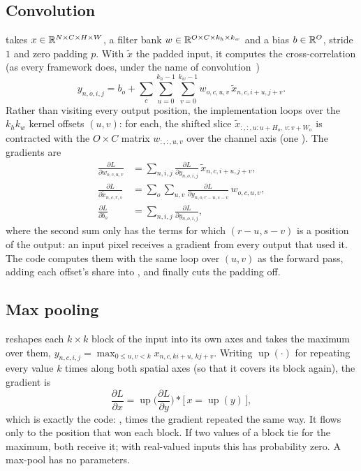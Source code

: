 \subsection{Convolution}
 takes $x \in \mathbb{R}^{N\times C\times H\times W}$, a filter bank
$w \in \mathbb{R}^{O\times C\times k_h\times k_w}$ and a bias $b \in \mathbb{R}^{O}$, stride $1$ and zero padding
$p$. With $\tilde x$ the padded input, it computes the cross-correlation (as every framework does,
under the name of convolution~\cite{upc-ipa})
\begin{equation}
  y_{n,o,i,j} = b_o + \sum_{c}\sum_{u=0}^{k_h-1}\sum_{v=0}^{k_w-1} w_{o,c,u,v}\,\tilde x_{n,c,i+u,j+v}.
\end{equation}
Rather than visiting every output position, the implementation loops over the $k_h k_w$ kernel
offsets $(u, v)$: for each, the shifted slice $\tilde x_{:,:,u:u+H_o,\,v:v+W_o}$ is contracted with
the $O\times C$ matrix $w_{:,:,u,v}$ over the channel axis (one ). The gradients are
\begin{align}
  \frac{\partial L}{\partial w_{o,c,u,v}} &= \sum_{n,i,j} \frac{\partial L}{\partial y_{n,o,i,j}}\,\tilde x_{n,c,i+u,j+v}, \\
  \frac{\partial L}{\partial \tilde x_{n,c,r,s}} &= \sum_{o}\sum_{u,v} \frac{\partial L}{\partial y_{n,o,r-u,s-v}}\, w_{o,c,u,v}, \\
  \frac{\partial L}{\partial b_o} &= \sum_{n,i,j} \frac{\partial L}{\partial y_{n,o,i,j}},
\end{align}
where the second sum only has the terms for which $(r-u, s-v)$ is a position of the output: an input
pixel receives a gradient from every output that used it. The code computes them with the same loop
over $(u, v)$ as the forward pass, adding each offset's share into , and finally cuts the
padding off.

\subsection{Max pooling}
 reshapes each $k\times k$ block of the input into its own axes and takes the
maximum over them, $y_{n,c,i,j} = \max_{0\le u,v<k} x_{n,c,ki+u,\,kj+v}$. Writing
$\operatorname{up}(\cdot)$ for repeating every value $k$ times along both spatial axes (so that it
covers its block again), the gradient is
\begin{equation}
  \frac{\partial L}{\partial x} = \operatorname{up}\!\Big(\frac{\partial L}{\partial y}\Big) \ast \big[\,x = \operatorname{up}(y)\,\big],
\end{equation}
which is exactly the code: , times the gradient
repeated the same way. It flows only to the position that won each block. If two values of a block
tie for the maximum, both receive it; with real-valued inputs this has probability zero. A max-pool
has no parameters.
